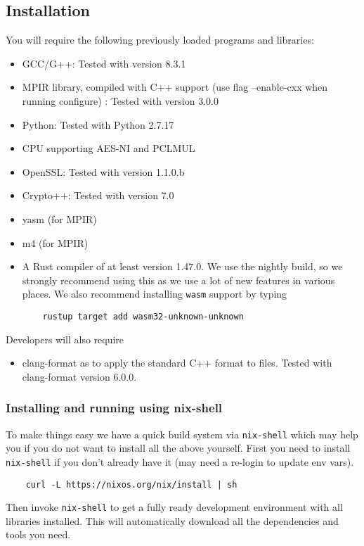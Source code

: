 
\subsection{Installation}\label{subsec:install}
You will require the following previously loaded programs and
libraries:
\begin{itemize}
\item GCC/G++: Tested with version 8.3.1
\item MPIR library, compiled with C++ support (use flag --enable-cxx when running configure) : Tested with version 3.0.0
\item Python: Tested with Python 2.7.17
\item CPU supporting AES-NI and PCLMUL
\item OpenSSL: Tested with version 1.1.0.b
\item Crypto++: Tested with version 7.0
\item yasm (for MPIR)
\item m4 (for MPIR)
\item A Rust compiler of at least version 1.47.0.
We use the nightly build, so we strongly recommend using this
as we use a lot of new features in various places.
We also recommend installing \verb|wasm| support by typing
\begin{verbatim}
    rustup target add wasm32-unknown-unknown
\end{verbatim}
\end{itemize}
Developers will also require
\begin{itemize}
\item clang-format as to apply the standard C++ format to files. Tested with clang-format version 6.0.0.
\end{itemize}

\subsubsection{Installing and running using nix-shell}
To make things easy we have a quick build system via \verb|nix-shell| which may help you
if you do not want to install all the above yourself.
First you need to install \verb|nix-shell| if you don't already have it (may need a re-login to update env vars).
\begin{verbatim}
    curl -L https://nixos.org/nix/install | sh
\end{verbatim}
Then invoke \verb|nix-shell| to get a fully ready development environment with all libraries installed.
This will automatically download all the dependencies and tools you need.

